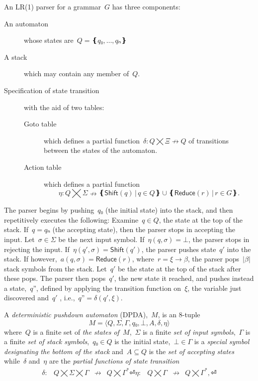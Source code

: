 An LR(1) parser for a grammar~$G$ has three components:
\begin{description}
  \item[An automaton] whose states are~$Q=❴q₀,…,qₙ❵$
  \item[A stack] which may contain any member of~$Q$.
  \item[Specification of state transition] with the aid of two tables:
        \begin{description}
          \item[Goto table] which defines a partial function~$δ:Q⨉Ξ↛Q$ of transitions
          between the states of the automaton.
          \item[Action table] which
            defines a partial function\[η:Q⨉Σ↛ ❴ \textsf{Shift}(q) \,|\, q∈Q❵ ∪ ❴\textsf{Reduce}(r) \,| \, r∈G❵.\]
        \end{description}
\end{description}
The parser begins by pushing~$q₀$ (the initial state) into the stack,
and then repetitively executes the following:
Examine~$q∈Q$, the state at the top of the stack.
If~$q=qₙ$ (the accepting state), then the parser stops in accepting the input.
Let~$σ∈Σ$ be the next input symbol.
If~$η(q,σ)=⊥$, the parser stops in rejecting the input.
If~$η(q',σ) = \textsf{Shift}(q')$, the parser pushes state~$q'$ into the stack.
If however,~$a(q,σ) = \textsf{Reduce}(r)$,
where~$r=ξ→β$,
the parser pops~$|β|$ stack symbols from the stack.
Let~$q'$ be the state at the top of the stack after these pops.
The parser then pops~$q'$, the new state it reached,
  and pushes instead a state,~$q”$, defined by applying the transition function on~$ξ$, the variable just discovered and~$q'$ , i.e.,~$q”=δ(q',ξ)$.

\begin{Definition}
  \label{Definition:DPDA}
  A \emph{deterministic pushdown automaton} (DPDA),~$M$, is an 8-tuple
  \[
    M =⟨Q,Σ,Γ, q₀,⊥, A,δ,η⟩
  \]
  where~$Q$ is a finite set of
  \emph{the states of~$M$},~$Σ$ is a finite
  \emph{set of input symbols},~$Γ$ is a finite
  \emph{set of stack symbols},~$q₀∈Q$ is the initial state,~$⊥∈Γ$
  is a \emph{special symbol designating the bottom of the stack}
  and~$A⊆Q$ is the \emph{set of accepting states} while~$δ$ and~$η$ are
  the \emph{partial functions of state transition}
  \[
    \begin{array}{crlc}
      δ: & Q⨉Σ⨉Γ &↛& Q⨉Γ^*⏎
      η: & Q⨉Γ &↛& Q⨉Γ^*,⏎
    \end{array}
  \]
\end{Definition}



